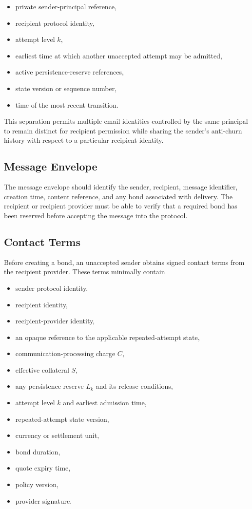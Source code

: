 \documentclass[11pt]{article}
\begin{document}
\begin{itemize}[leftmargin=2em]
    \item private sender-principal reference,
    \item recipient protocol identity,
    \item attempt level $k$,
    \item earliest time at which another unaccepted attempt may be admitted,
    \item active persistence-reserve references,
    \item state version or sequence number,
    \item time of the most recent transition.
\end{itemize}

This separation permits multiple email identities controlled by the same principal to remain distinct for recipient permission while sharing the sender's anti-churn history with respect to a particular recipient identity.

\subsection{Message Envelope}

The message envelope should identify the sender, recipient, message identifier, creation time, content reference, and any bond associated with delivery. The recipient or recipient provider must be able to verify that a required bond has been reserved before accepting the message into the protocol.

\subsection{Contact Terms}

Before creating a bond, an unaccepted sender obtains signed contact terms from the recipient provider. These terms minimally contain

\begin{itemize}[leftmargin=2em]
    \item sender protocol identity,
    \item recipient identity,
    \item recipient-provider identity,
    \item an opaque reference to the applicable repeated-attempt state,
    \item communication-processing charge $C$,
    \item effective collateral $S$,
    \item any persistence reserve $L_k$ and its release conditions,
    \item attempt level $k$ and earliest admission time,
    \item repeated-attempt state version,
    \item currency or settlement unit,
    \item bond duration,
    \item quote expiry time,
    \item policy version,
    \item provider signature.
\end{itemize}
\end{document}
